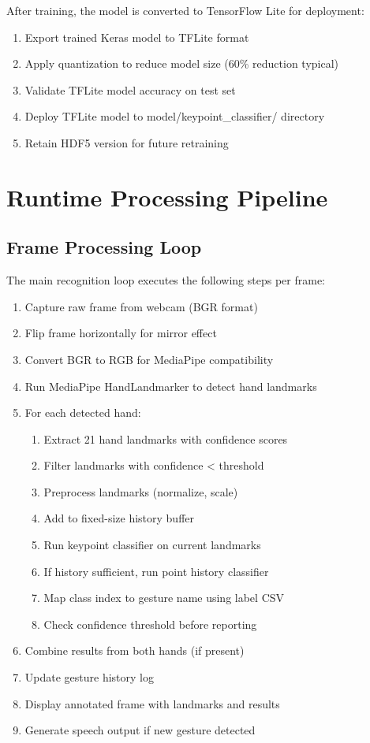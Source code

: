 After training, the model is converted to TensorFlow Lite for deployment:
\begin{enumerate}
    \item Export trained Keras model to TFLite format
    \item Apply quantization to reduce model size (60\% reduction typical)
    \item Validate TFLite model accuracy on test set
    \item Deploy TFLite model to model/keypoint\_classifier/ directory
    \item Retain HDF5 version for future retraining
\end{enumerate}

\section{Runtime Processing Pipeline}

\subsection{Frame Processing Loop}

The main recognition loop executes the following steps per frame:

\begin{enumerate}
    \item Capture raw frame from webcam (BGR format)
    \item Flip frame horizontally for mirror effect
    \item Convert BGR to RGB for MediaPipe compatibility
    \item Run MediaPipe HandLandmarker to detect hand landmarks
    \item For each detected hand:
    \begin{enumerate}
        \item Extract 21 hand landmarks with confidence scores
        \item Filter landmarks with confidence < threshold
        \item Preprocess landmarks (normalize, scale)
        \item Add to fixed-size history buffer
        \item Run keypoint classifier on current landmarks
        \item If history sufficient, run point history classifier
        \item Map class index to gesture name using label CSV
        \item Check confidence threshold before reporting
    \end{enumerate}
    \item Combine results from both hands (if present)
    \item Update gesture history log
    \item Display annotated frame with landmarks and results
    \item Generate speech output if new gesture detected
\end{enumerate}

